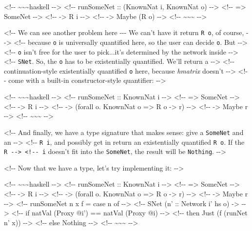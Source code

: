 \documentclass[]{article}
\begin{document}
\textless{}!-\/- \textasciitilde{}\textasciitilde{}\textasciitilde{}haskell
-\/-\textgreater{} \textless{}!-\/- runSomeNet :: (KnownNat i, KnownNat o)
-\/-\textgreater{} \textless{}!-\/- =\textgreater{} SomeNet -\/-\textgreater{}
\textless{}!-\/- -\textgreater{} R i -\/-\textgreater{} \textless{}!-\/-
-\textgreater{} Maybe (R o) -\/-\textgreater{} \textless{}!-\/-
\textasciitilde{}\textasciitilde{}\textasciitilde{} -\/-\textgreater{}

\textless{}!-\/- We can see another problem here -\/-\/- We can't have it return
\texttt{R\ o}, of course, -\/-\textgreater{} \textless{}!-\/- because \texttt{o}
is universally quantified here, so the user can decide \texttt{o}. But
-\/-\textgreater{} \textless{}!-\/- \texttt{o} isn't free for the user to
pick...it's determined by the network inside -\/-\textgreater{} \textless{}!-\/-
\texttt{SNet}. So, the \texttt{o} has to be existentially quantified. We'll
return a -\/-\textgreater{} \textless{}!-\/- continuation-style existentially
quantified \texttt{o} here, because \emph{hmatrix} doesn't -\/-\textgreater{}
\textless{}!-\/- come with a built-in constructor-style quantifier:
-\/-\textgreater{}

\textless{}!-\/- \textasciitilde{}\textasciitilde{}\textasciitilde{}haskell
-\/-\textgreater{} \textless{}!-\/- runSomeNet :: KnownNat i -\/-\textgreater{}
\textless{}!-\/- =\textgreater{} SomeNet -\/-\textgreater{} \textless{}!-\/-
-\textgreater{} R i -\/-\textgreater{} \textless{}!-\/- -\textgreater{} (forall
o. KnownNat o =\textgreater{} R o -\textgreater{} r) -\/-\textgreater{}
\textless{}!-\/- -\textgreater{} Maybe r -\/-\textgreater{} \textless{}!-\/-
\textasciitilde{}\textasciitilde{}\textasciitilde{} -\/-\textgreater{}

\textless{}!-\/- And finally, we have a type signature that makes sense: give a
\texttt{SomeNet} and an -\/-\textgreater{} \textless{}!-\/- \texttt{R\ i}, and
possibly get in return an existentially quantified \texttt{R\ o}. If the
\texttt{R\ -\/-\textgreater{}\ \textless{}!-\/-\ i} doesn't fit into the
\texttt{SomeNet}, the result will be \texttt{Nothing}. -\/-\textgreater{}

\textless{}!-\/- Now that we have a type, let's try implementing it:
-\/-\textgreater{}

\textless{}!-\/- \textasciitilde{}\textasciitilde{}\textasciitilde{}haskell
-\/-\textgreater{} \textless{}!-\/- runSomeNet :: KnownNat i -\/-\textgreater{}
\textless{}!-\/- =\textgreater{} SomeNet -\/-\textgreater{} \textless{}!-\/-
-\textgreater{} R i -\/-\textgreater{} \textless{}!-\/- -\textgreater{} (forall
o. KnownNat o =\textgreater{} R o -\textgreater{} r) -\/-\textgreater{}
\textless{}!-\/- -\textgreater{} Maybe r -\/-\textgreater{} \textless{}!-\/-
runSomeNet n x f = case n of -\/-\textgreater{} \textless{}!-\/- SNet (n' ::
Network i' hs o) -\textgreater{} -\/-\textgreater{} \textless{}!-\/- if natVal
(Proxy @i') == natVal (Proxy @i) -\/-\textgreater{} \textless{}!-\/- then Just
(f (runNet n' x)) -\/-\textgreater{} \textless{}!-\/- else Nothing
-\/-\textgreater{} \textless{}!-\/-
\textasciitilde{}\textasciitilde{}\textasciitilde{} -\/-\textgreater{}
\end{document}
